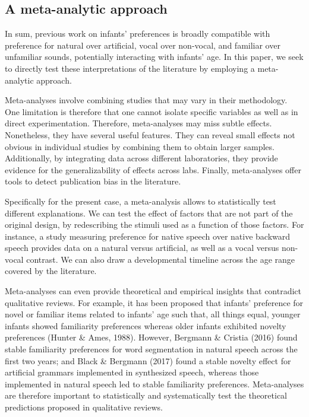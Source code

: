 \documentclass[man]{apa6}
\begin{document}
\hypertarget{a-meta-analytic-approach}{%
\subsection{A meta-analytic approach}\label{a-meta-analytic-approach}}

In sum, previous work on infants' preferences is broadly compatible with preference for natural over artificial, vocal over non-vocal, and familiar over unfamiliar sounds, potentially interacting with infants' age. In this paper, we seek to directly test these interpretations of the literature by employing a meta-analytic approach.

Meta-analyses involve combining studies that may vary in their methodology. One limitation is therefore that one cannot isolate specific variables as well as in direct experimentation. Therefore, meta-analyses may miss subtle effects. Nonetheless, they have several useful features. They can reveal small effects not obvious in individual studies by combining them to obtain larger samples. Additionally, by integrating data across different laboratories, they provide evidence for the generalizability of effects across labs. Finally, meta-analyses offer tools to detect publication bias in the literature.

Specifically for the present case, a meta-analysis allows to statistically test different explanations. We can test the effect of factors that are not part of the original design, by redescribing the stimuli used as a function of those factors. For instance, a study measuring preference for native speech over native backward speech provides data on a natural versus artificial, as well as a vocal versus non-vocal contrast. We can also draw a developmental timeline across the age range covered by the literature.

Meta-analyses can even provide theoretical and empirical insights that contradict qualitative reviews. For example, it has been proposed that infants' preference for novel or familiar items related to infants' age such that, all things equal, younger infants showed familiarity preferences whereas older infants exhibited novelty preferences (Hunter \& Ames, 1988). However, Bergmann \& Cristia (2016) found stable familiarity preferences for word segmentation in natural speech across the first two years; and Black \& Bergmann (2017) found a stable novelty effect for artificial grammars implemented in synthesized speech, whereas those implemented in natural speech led to stable familiarity preferences. Meta-analyses are therefore important to statistically and systematically test the theoretical predictions proposed in qualitative reviews.
\end{document}
